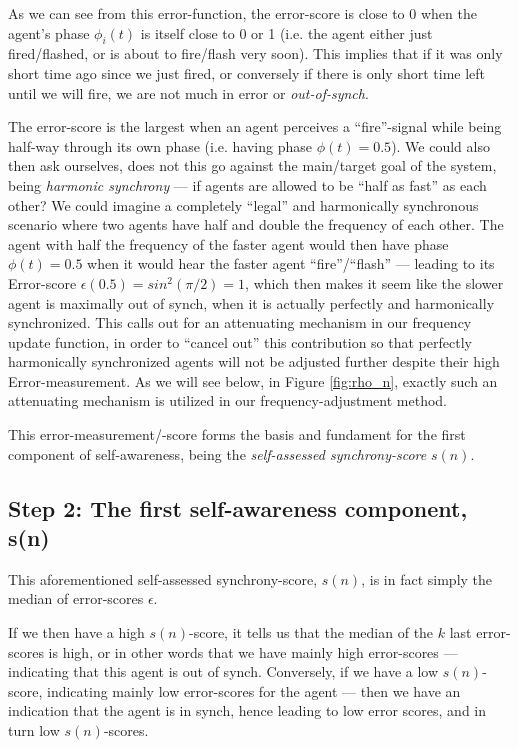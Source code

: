 As we can see from this error-function, the error-score is close to 0 when the agent's phase $\phi_i(t)$ is itself close to 0 or 1 (i.e. the agent either just fired/flashed, or is about to fire/flash very soon). This implies that if it was only short time ago since we just fired, or conversely if there is only short time left until we will fire, we are not much in error or \textit{out-of-synch}. 

The error-score is the largest when an agent perceives a ``fire''-signal while being half-way through its own phase (i.e. having phase $\phi(t)=0.5$). We could also then ask ourselves, does not this go against the main/target goal of the system, being \textit{harmonic synchrony} — if agents are allowed to be ``half as fast'' as each other? We could imagine a completely ``legal'' and harmonically synchronous scenario where two agents have half and double the frequency of each other. The agent with half the frequency of the faster agent would then have phase $\phi(t)=0.5$ when it would hear the faster agent ``fire''/``flash'' — leading to its Error-score $\epsilon(0.5) = sin^2(\pi/2) = 1$, which then makes it seem like the slower agent is maximally out of synch, when it is actually perfectly and harmonically synchronized. This calls out for an attenuating mechanism in our frequency update function, in order to ``cancel out'' this contribution so that perfectly harmonically synchronized agents will not be adjusted further despite their high Error-measurement. As we will see below, in Figure \ref{fig:rho_n}, exactly such an attenuating mechanism is utilized in our frequency-adjustment method.

This error-measurement/-score forms the basis and fundament for the first component of self-awareness, being the \textit{self-assessed synchrony-score} $s(n)$.

\subsection{Step 2: The first self-awareness component, s(n)}
\label{s_n}
This aforementioned self-assessed synchrony-score, $s(n)$, is in fact simply the median of error-scores $\epsilon$.

If we then have a high $s(n)$-score, it tells us that the median of the $k$ last error-scores is high, or in other words that we have mainly high error-scores — indicating that this agent is out of synch. Conversely, if we have a low $s(n)$-score, indicating mainly low error-scores for the agent — then we have an indication that the agent is in synch, hence leading to low error scores, and in turn low $s(n)$-scores. 

